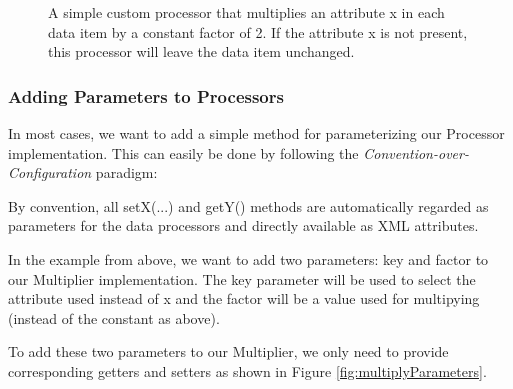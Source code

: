 \begin{figure}[h!]
  \caption{\label{fig:multiplyImpl}A simple custom processor that multiplies an attribute {\ttfamily x} in each data item by a constant factor of 2. If the attribute {\ttfamily x} is not present, this processor will leave the data item unchanged.}
\end{figure}


\subsubsection{Adding Parameters to Processors}
In most cases, we want to add a simple method for parameterizing our
Processor implementation. This can easily be done by following the
{\em Convention-over-Configuration} paradigm:

By convention, all {\ttfamily setX(...)} and {\ttfamily getY()}
methods are automatically regarded as parameters for the data
processors and directly available as XML attributes.

In the example from above, we want to add two parameters: {\ttfamily
key} and {\ttfamily factor} to our Multiplier implementation. The
{\ttfamily key} parameter will be used to select the attribute used
instead of {\ttfamily x} and the {\ttfamily factor} will be a value
used for multipying (instead of the constant {} as above).

To add these two parameters to our Multiplier, we only need to provide
corresponding getters and setters as shown in Figure
\ref{fig:multiplyParameters}.

